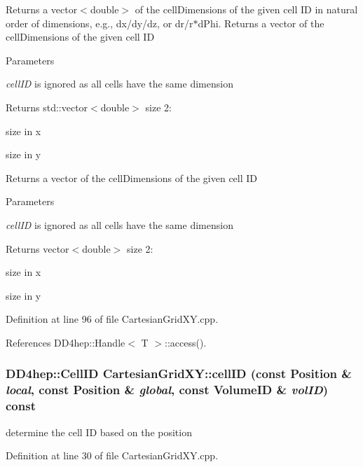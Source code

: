 Returns a vector$<$double$>$ of the cellDimensions of the given cell ID in natural order of dimensions, e.g., dx/dy/dz, or dr/r$\ast$dPhi. Returns a vector of the cellDimensions of the given cell ID 
\begin{DoxyParams}{Parameters}
\item[{\em cellID}]is ignored as all cells have the same dimension \end{DoxyParams}
\begin{DoxyReturn}{Returns}
std::vector$<$double$>$ size 2:
\begin{DoxyEnumerate}
\item size in x
\item size in y
\end{DoxyEnumerate}
\end{DoxyReturn}
Returns a vector of the cellDimensions of the given cell ID 
\begin{DoxyParams}{Parameters}
\item[{\em cellID}]is ignored as all cells have the same dimension \end{DoxyParams}
\begin{DoxyReturn}{Returns}
vector$<$double$>$ size 2:
\begin{DoxyEnumerate}
\item size in x
\item size in y 
\end{DoxyEnumerate}
\end{DoxyReturn}


Definition at line 96 of file CartesianGridXY.cpp.

References DD4hep::Handle$<$ T $>$::access().\hypertarget{class_d_d4hep_1_1_geometry_1_1_cartesian_grid_x_y_a1d4eb67f1922ce37e737d63199ecfb54}{
\subsubsection[{cellID}]{\setlength{\rightskip}{0pt plus 5cm}DD4hep::CellID CartesianGridXY::cellID (const {\bf Position} \& {\em local}, \/  const {\bf Position} \& {\em global}, \/  const VolumeID \& {\em volID}) const}}
\label{class_d_d4hep_1_1_geometry_1_1_cartesian_grid_x_y_a1d4eb67f1922ce37e737d63199ecfb54}


determine the cell ID based on the position 

Definition at line 30 of file CartesianGridXY.cpp.

